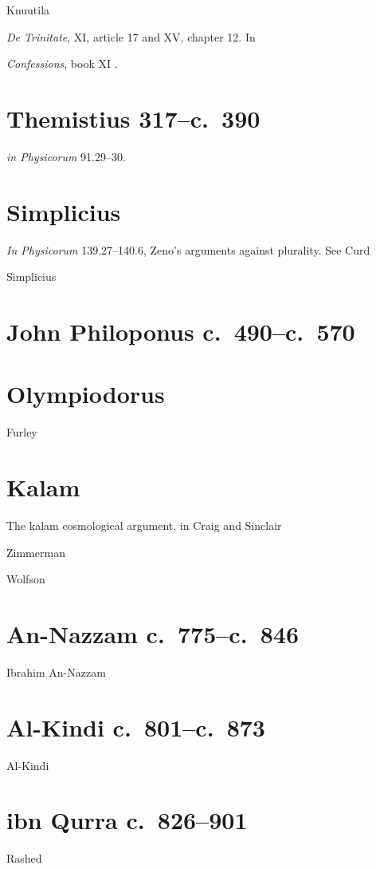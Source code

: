 \documentclass{article}
\begin{document}
Knuutila \cite{knuutila}

{\em De Trinitate}, XI, article 17 and XV, chapter 12. In \cite{trinity815}

{\em Confessions}, book XI \cite{confessions}.

\section{Themistius 317--c.~390}
{\em in Physicorum} 91.29--30.



\section{Simplicius}
{\em In Physicorum} 139.27--140.6, Zeno's arguments against plurality. See Curd \cite[pp.~171--186]{monism}

Simplicius \cite{corollaries}


\section{John Philoponus c.~490--c.~570}


\section{Olympiodorus}
Furley \cite{furley1982}


\section{Kalam}
The kalam cosmological argument, in Craig and Sinclair \cite{kalam}

Zimmerman \cite{zimmerman}

Wolfson \cite{wolfsonIV}

\section{An-Nazzam c.~775--c.~846}
Ibrahim An-Nazzam

\section{Al-Kindi c.~801--c.~873}
Al-Kindi \cite{alkindi}

\section{ibn Qurra c.~826--901}
Rashed \cite{rashed2009}
\end{document}
